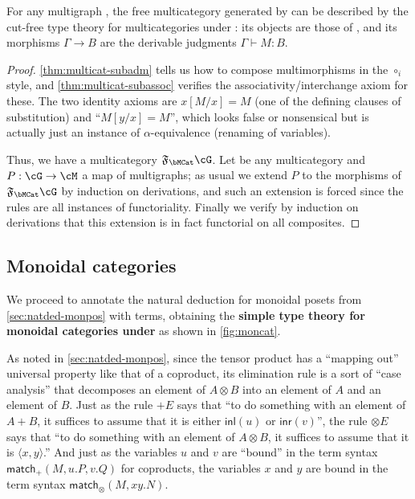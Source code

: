 \documentclass{book}
\let\types\vdash
\newcommand{\F}[1]{\mathfrak{F}_{#1}}
\def\pair#1#2{\langle #1,#2\rangle}
\def\plusE{\mathord{+}E}
\def\inl{\mathsf{inl}}
\def\inr{\mathsf{inr}}
\def\case{\mathsf{match}_+}
\def\match{\mathsf{match}}
\let\tensor\otimes
\def\tensorE{\mathord{\tensor}E}
\begin{document}
\begin{thm}\label{thm:multicat-initial}
  For any multigraph \cG, the free multicategory generated by \cG can be described by the cut-free type theory for multicategories under \cG: its objects are those of \cG, and its morphisms $\Gamma\to B$ are the derivable judgments $\Gamma\types M:B$.
\end{thm}
\begin{proof}
  \cref{thm:multicat-subadm} tells us how to compose multimorphisms in the $\circ_i$ style, and \cref{thm:multicat-subassoc} verifies the associativity/interchange axiom for these.
  The two identity axioms are $x[M/x]=M$ (one of the defining clauses of substitution) and ``$M[y/x] = M$'', which looks false or nonsensical but is actually just an instance of $\alpha$-equivalence (renaming of variables).

  Thus, we have a multicategory $\F\bMCat\cG$.
  Let \cM be any multicategory and $P:\cG\to\cM$ a map of multigraphs; as usual we extend $P$ to the morphisms of $\F\bMCat\cG$ by induction on derivations, and such an extension is forced since the rules are all instances of functoriality.
  Finally we verify by induction on derivations that this extension is in fact functorial on all composites.
\end{proof}


\subsection{Monoidal categories}
\label{sec:moncat}

We proceed to annotate the natural deduction for monoidal posets from \cref{sec:natded-monpos} with terms, obtaining the \textbf{simple type theory for monoidal categories under \cG} as shown in \cref{fig:moncat}.

As noted in \cref{sec:natded-monpos}, since the tensor product has a ``mapping out'' universal property like that of a coproduct, its elimination rule is a sort of ``case analysis'' that decomposes an element of $A\tensor B$ into an element of $A$ and an element of $B$.
Just as the rule $\plusE$ says that ``to do something with an element of $A+B$, it suffices to assume that it is either $\inl(u)$ or $\inr(v)$'', the rule $\tensorE$ says that ``to do something with an element of $A\tensor B$, it suffices to assume that it is $\pair{x}{y}$.''
And just as the variables $u$ and $v$ are ``bound'' in the term syntax $\case(M,u.P,v.Q)$ for coproducts, the variables $x$ and $y$ are bound in the term syntax $\match_\tensor(M,xy.N)$.
\end{document}
